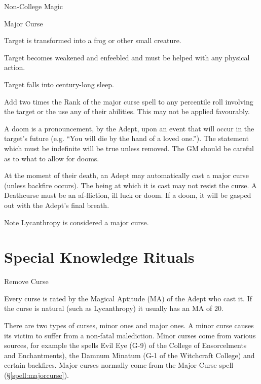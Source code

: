 \begin{Chapter}{Non-College Magic}
\begin{ritual}{Major Curse}
\begin{effects}
\begin{Enumerate}
\item Target is transformed into a frog or other small creature.

\item Target  becomes  weakened  and  enfeebled  and 
must be helped with any physical action. 

\item Target falls into century-long sleep. 
\end{Enumerate}

\begin{Description}
\item[Ill Luck] Add two times the Rank of the major curse spell to any
  percentile roll involving the target or the use any of their
  abilities. This may not be applied favourably.

\item[Doom] A doom is a pronouncement, by the Adept, upon an event
  that will occur in the target’s future (e.g.  “You will die by the
  hand of a loved one.”).  The statement which must be indefinite will
  be true unless removed.  The GM should be careful as to what to
  allow for dooms.

\item[Death-curse] At the moment of their death, an Adept may
  automatically cast a major curse (unless backfire occurs).  The
  being at which it is cast may not resist the curse.  A Deathcurse
  must be an af-fliction, ill luck or doom.  If a doom, it will be
  gasped out with the Adept’s final breath.
\end{Description}
Note Lycanthropy is considered a major curse.
\end{effects}
\end{ritual}


\section{Special Knowledge Rituals}


\begin{ritual}{Remove Curse}
\label{ritual:removecurse}
\begin{effects}
Every curse is rated by the Magical Aptitude (MA) of the Adept who
cast it. If the curse is natural (such as Lycanthropy) it usually has
an MA of 20.

There are two types of curses, minor ones and major ones.  A minor
curse causes its victim to suffer from a non-fatal malediction.  Minor
curses come from various sources, for example the spells Evil Eye (G-9)
of the College of Ensorcelments and Enchantments), the Damnum Minatum
(G-1 of the Witchcraft College) and certain backfires.  Major curses
normally come from the Major Curse spell (\S\ref{spell:majorcurse}).


\end{effects}
\end{ritual}
\end{Chapter}

